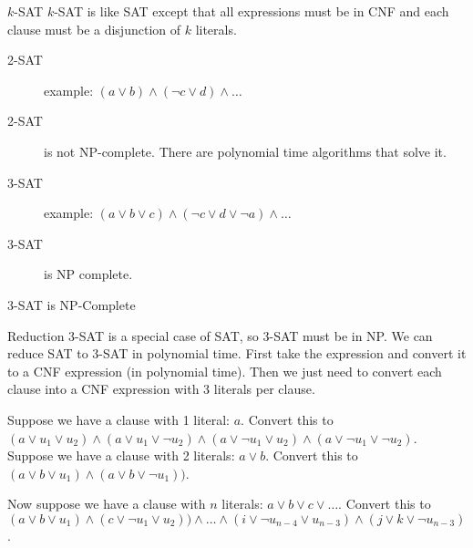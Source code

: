 \begin{frame}{$k$-SAT}
  $k$-SAT is like SAT except that all expressions must be in CNF and each clause must be a disjunction of $k$ literals.

  \vspace{2mm}

  \begin{description}
    \item[2-SAT] example: $(a \lor b) \land (\neg c \lor d) \land \ldots$
    \item[2-SAT] is not NP-complete. There are polynomial time algorithms that solve it.
    \item[3-SAT] example: $(a \lor b \lor c) \land (\neg c \lor d \lor \neg a) \land \ldots$
    \item[3-SAT] is NP complete.
  \end{description}
\end{frame}


\begin{frame}{3-SAT is NP-Complete}

  \begin{alertblock}{Reduction}
    3-SAT is a special case of SAT, so 3-SAT must be in NP.
    We can reduce SAT to 3-SAT in polynomial time.
    First take the expression and convert it to a CNF expression (in polynomial time).
    Then we just need to convert each clause into a CNF expression with 3 literals per clause.
    
    Suppose we have a clause with 1 literal: $a$.
    Convert this to $(a \lor u_1 \lor u_2) \land (a \lor u_1 \lor \neg u_2) \land (a \lor \neg u_1 \lor u_2) \land (a \lor \neg u_1 \lor \neg u_2)$.
    Suppose we have a clause with 2 literals: $a \lor b$.
    Convert this to $(a \lor b \lor u_1) \land (a \lor b \lor \neg u_1))$.
    
    Now suppose we have a clause with $n$ literals: $a \lor b \lor c \lor \ldots$.
    Convert this to $(a \lor b \lor u_1) \land (c \lor \neg u_1 \lor u_2)) \land \ldots \land (i \lor \neg u_{n-4} \lor u_{n-3}) \land (j \lor k \lor \neg u_{n-3})$.
  \end{alertblock}

\end{frame}